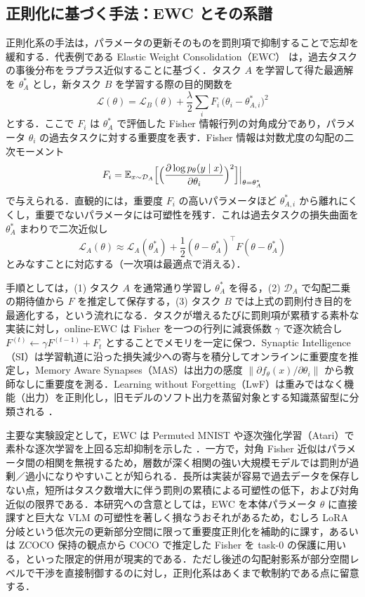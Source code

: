 \subsection{正則化に基づく手法：EWC とその系譜}

正則化系の手法は，パラメータの更新そのものを罰則項で抑制することで忘却を緩和する．代表例である Elastic Weight Consolidation（EWC）\cite{ewc} は，過去タスクの事後分布をラプラス近似することに基づく．タスク $A$ を学習して得た最適解を $\theta_A^{*}$ とし，新タスク $B$ を学習する際の目的関数を
\begin{equation}
\mathcal{L}(\theta)=\mathcal{L}_B(\theta)+\frac{\lambda}{2}\sum_i F_i\,\bigl(\theta_i-\theta_{A,i}^{*}\bigr)^2
\end{equation}
とする．ここで $F_i$ は $\theta_A^{*}$ で評価した Fisher 情報行列の対角成分であり，パラメータ $\theta_i$ の過去タスクに対する重要度を表す．Fisher 情報は対数尤度の勾配の二次モーメント
\begin{equation}
F_i=\mathbb{E}_{x\sim\mathcal{D}_A}\Bigl[\Bigl(\frac{\partial \log p_\theta(y\mid x)}{\partial \theta_i}\Bigr)^2\Bigr]\Big|_{\theta=\theta_A^{*}}
\end{equation}
で与えられる．直観的には，重要度 $F_i$ の高いパラメータほど $\theta_{A,i}^{*}$ から離れにくくし，重要でないパラメータには可塑性を残す．これは過去タスクの損失曲面を $\theta_A^{*}$ まわりで二次近似し
\begin{equation}
\mathcal{L}_A(\theta)\approx \mathcal{L}_A(\theta_A^{*})+\frac{1}{2}(\theta-\theta_A^{*})^{\top}F(\theta-\theta_A^{*})
\end{equation}
とみなすことに対応する（一次項は最適点で消える）．

手順としては，(1) タスク $A$ を通常通り学習し $\theta_A^{*}$ を得る，(2) $\mathcal{D}_A$ で勾配二乗の期待値から $F$ を推定して保存する，(3) タスク $B$ では上式の罰則付き目的を最適化する，という流れになる．タスクが増えるたびに罰則項が累積する素朴な実装に対し，online-EWC は Fisher を一つの行列に減衰係数 $\gamma$ で逐次統合し $F^{(t)}\leftarrow\gamma F^{(t-1)}+F_t$ とすることでメモリを一定に保つ．Synaptic Intelligence（SI）は学習軌道に沿った損失減少への寄与を積分してオンラインに重要度を推定し，Memory Aware Synapses（MAS）は出力の感度 $\|\partial f_\theta(x)/\partial\theta_i\|$ から教師なしに重要度を測る．Learning without Forgetting（LwF）は重みではなく機能（出力）を正則化し，旧モデルのソフト出力を蒸留対象とする知識蒸留型に分類される \cite{clsurvey}．

主要な実験設定として，EWC は Permuted MNIST や逐次強化学習（Atari）で素朴な逐次学習を上回る忘却抑制を示した \cite{ewc}．一方で，対角 Fisher 近似はパラメータ間の相関を無視するため，層数が深く相関の強い大規模モデルでは罰則が過剰／過小になりやすいことが知られる．長所は実装が容易で過去データを保存しない点，短所はタスク数増大に伴う罰則の累積による可塑性の低下，および対角近似の限界である．本研究への含意としては，EWC を本体パラメータ $\theta$ に直接課すと巨大な VLM の可塑性を著しく損なうおそれがあるため，むしろ LoRA 分岐という低次元の更新部分空間に限って重要度正則化を補助的に課す，あるいは ZCOCO 保持の観点から COCO で推定した Fisher を task-0 の保護に用いる，といった限定的併用が現実的である．ただし後述の勾配射影系が部分空間レベルで干渉を直接制御するのに対し，正則化系はあくまで軟制約である点に留意する．

